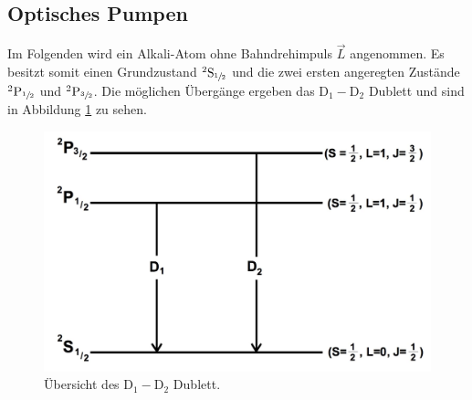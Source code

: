 \subsection{Optisches Pumpen}
Im Folgenden wird ein Alkali-Atom ohne Bahndrehimpuls $\vec{L}$ angenommen. Es besitzt somit einen Grundzustand ${}^2\text{S}_{\sfrac{1}{2}}$ und die zwei ersten angeregten Zustände ${}^2\text{P}_{\sfrac{1}{2}}$ und ${}^2\text{P}_{\sfrac{3}{2}}$. Die möglichen Übergänge ergeben das $\text{D}_1-\text{D}_2$ Dublett und sind in Abbildung \ref{fig:dublett} zu sehen.
\begin{figure}[H]
	\centering
	\includegraphics[width=0.8\linewidth]{img/dublett.jpg}
	\caption{Übersicht des $\text{D}_1-\text{D}_2$ Dublett.\cite{V21}}
	\label{fig:dublett}
\end{figure}

